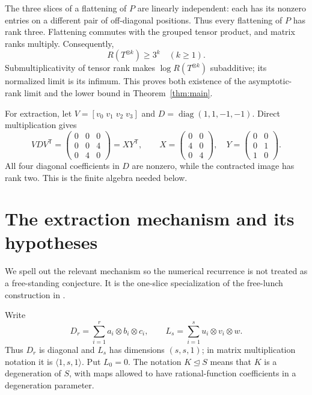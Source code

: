 \documentclass[11pt]{article}
\newcommand{\diag}{\operatorname{diag}}
\newcommand{\degto}{\trianglelefteq}
\theoremstyle{definition}\newtheorem{definition}[theorem]{Definition}
\theoremstyle{remark}\newtheorem{remark}[theorem]{Remark}
\begin{document}
The three slices of a flattening of $P$ are linearly independent: each has its
nonzero entries on a different pair of off-diagonal positions. Thus every
flattening of $P$ has rank three. Flattening commutes with the grouped tensor
product, and matrix ranks multiply. Consequently,
\[
R(T^{\otimes k})\geq3^k\quad(k\geq1).
\]
Submultiplicativity of tensor rank makes $\log R(T^{\otimes k})$ subadditive;
its normalized limit is its infimum. This proves both existence of the
asymptotic-rank limit and the lower bound in Theorem~\ref{thm:main}.

For extraction, let $V=[v_0\;v_1\;v_2\;v_3]$ and
$D=\diag(1,1,-1,-1)$. Direct multiplication gives
\begin{equation}\label{eq:sign}
VDV^\mathsf T=
\begin{pmatrix}0&0&0\\0&0&4\\0&4&0\end{pmatrix}=XY^\mathsf T,
\qquad
X=\begin{pmatrix}0&0\\4&0\\0&4\end{pmatrix},\quad
Y=\begin{pmatrix}0&0\\0&1\\1&0\end{pmatrix}.
\end{equation}
All four diagonal coefficients in $D$ are nonzero, while the contracted image
has rank two. This is the finite algebra needed below.

\section{The extraction mechanism and its hypotheses}
We spell out the relevant mechanism so the numerical recurrence is not treated
as a free-standing conjecture. It is the one-slice specialization of the
free-lunch construction in \cite[Section 5]{alman}.

Write
\[
D_r=\sum_{i=1}^r a_i\otimes b_i\otimes c_i,
\qquad L_s=\sum_{i=1}^s u_i\otimes v_i\otimes w.
\]
Thus $D_r$ is diagonal and $L_s$ has dimensions $(s,s,1)$; in matrix multiplication
notation it is $\langle1,s,1\rangle$. Put $L_0=0$.
The notation $K\degto S$ means that $K$ is a degeneration of $S$, with maps
allowed to have rational-function coefficients in a degeneration parameter.
\end{document}
